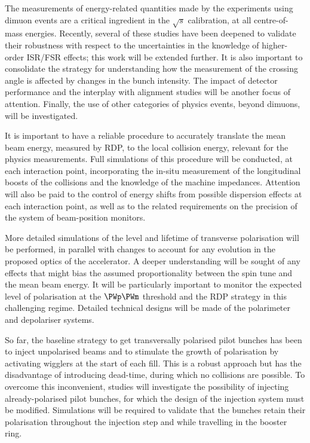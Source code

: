 The measurements of energy-related quantities made by the experiments using dimuon events 
are a critical ingredient in the $\sqrt{s}$ calibration, at all centre-of-mass energies. 
Recently, several of these studies have been deepened to validate their robustness 
with respect to the uncertainties in the knowledge of higher-order ISR/FSR effects;
this work will be extended further.  
It is also important to consolidate the strategy for understanding 
how the measurement of the crossing angle is affected by changes in the bunch intensity.
The impact of detector performance and the interplay with alignment studies will be another focus of attention. 
Finally, the use of other categories of physics events, beyond dimuons, will be investigated.

It is important to have a reliable procedure to accurately translate the mean beam energy, measured by RDP,
to the local collision energy, relevant for the physics measurements.
Full simulations of this procedure will be conducted, at each interaction point,
incorporating the in-situ measurement of the longitudinal boosts of the collisions and
the knowledge of the machine impedances.
Attention will also be paid to the control of energy shifts from possible dispersion effects at each interaction point, 
as well as to the related requirements on the precision of the system of beam-position monitors.

More detailed simulations of the level and lifetime of transverse polarisation will be performed, 
in parallel with changes to account for any evolution in the proposed optics of the accelerator. 
A deeper understanding will be sought of any effects that might bias 
the assumed proportionality between the spin tune and the mean beam energy.  
It will be particularly important to monitor the expected level of polarisation at the $\PWp\PWm$ threshold 
and the RDP strategy in this challenging regime. 
Detailed technical designs will be made of the polarimeter and depolariser systems.

So far, the baseline strategy to get transversally polarised pilot bunches 
has been to inject unpolarised beams and to stimulate the growth of polarisation by activating wigglers at the start of each fill. 
This is a robust approach but has the disadvantage of introducing dead-time, during which no collisions are possible.  
To overcome this inconvenient, 
studies will investigate the possibility of injecting already-polarised pilot bunches,
for which the design of the injection system must be modified. 
Simulations will be required to validate that the bunches retain their polarisation throughout the injection step 
and while travelling in the booster ring.

